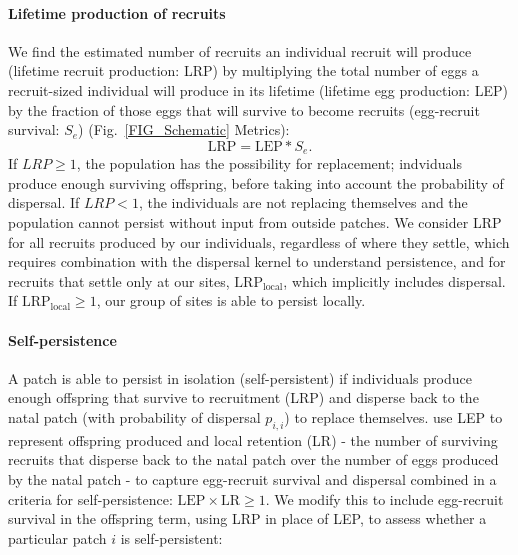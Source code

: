 \documentclass[12pt, oneside]{article}   	%
\begin{document}
\paragraph*{Lifetime production of recruits}

We find the estimated number of recruits an individual recruit will produce (lifetime recruit production: LRP) by multiplying the total number of eggs a recruit-sized individual will produce in its lifetime (lifetime egg production: LEP) by the fraction of those eggs that will survive to become recruits (egg-recruit survival: $S_e$) (Fig.\ \ref{FIG_Schematic} Metrics):
\begin{equation}
\text{LRP} = \text{LEP} * S_e. \label{EQN_LRP}
\end{equation}
If $LRP \geq 1$, the population has the possibility for replacement; indviduals produce enough surviving offspring, before taking into account the probability of dispersal. If $LRP < 1$, the individuals are not replacing themselves and the population cannot persist without input from outside patches. We consider LRP for all recruits produced by our individuals, regardless of where they settle, which requires combination with the dispersal kernel to understand persistence, and for recruits that settle only at our sites, $\text{LRP}_\text{local}$, which implicitly includes dispersal. If $\text{LRP}_\text{local} \geq 1$, our group of sites is able to persist locally. 

\paragraph*{Self-persistence} 

A patch is able to persist in isolation (self-persistent) if individuals produce enough offspring that survive to recruitment (LRP) and disperse back to the natal patch (with probability of dispersal $p_{i,i}$) to replace themselves. \cite{burgess2014beyond} use LEP to represent offspring produced and local retention (LR) - the number of surviving recruits that disperse back to the natal patch over the number of eggs produced by the natal patch - to capture egg-recruit survival and dispersal combined in a criteria for self-persistence: $\text{LEP} \times \text{LR} \geq 1$. We modify this to include egg-recruit survival in the offspring term, using LRP in place of LEP, to assess whether a particular patch $i$ is self-persistent:
\end{document}
